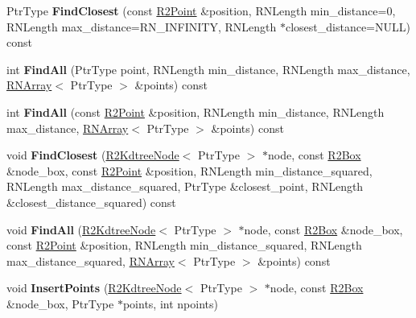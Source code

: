 \begin{DoxyCompactItemize}
\item 
Ptr\+Type {\bfseries Find\+Closest} (const \hyperlink{class_r2_point}{R2\+Point} \&position, R\+N\+Length min\+\_\+distance=0, R\+N\+Length max\+\_\+distance=R\+N\+\_\+\+I\+N\+F\+I\+N\+I\+TY, R\+N\+Length $\ast$closest\+\_\+distance=N\+U\+LL) const \hypertarget{class_r2_kdtree_a26c4b726cec05ccac33804cba6cf038f}{}\label{class_r2_kdtree_a26c4b726cec05ccac33804cba6cf038f}

\item 
int {\bfseries Find\+All} (Ptr\+Type point, R\+N\+Length min\+\_\+distance, R\+N\+Length max\+\_\+distance, \hyperlink{class_r_n_array}{R\+N\+Array}$<$ Ptr\+Type $>$ \&points) const \hypertarget{class_r2_kdtree_a8ad946e2ab17179786670239a4e8fc4e}{}\label{class_r2_kdtree_a8ad946e2ab17179786670239a4e8fc4e}

\item 
int {\bfseries Find\+All} (const \hyperlink{class_r2_point}{R2\+Point} \&position, R\+N\+Length min\+\_\+distance, R\+N\+Length max\+\_\+distance, \hyperlink{class_r_n_array}{R\+N\+Array}$<$ Ptr\+Type $>$ \&points) const \hypertarget{class_r2_kdtree_addf1ad4aa68545c20af85960b151ea6c}{}\label{class_r2_kdtree_addf1ad4aa68545c20af85960b151ea6c}

\item 
void {\bfseries Find\+Closest} (\hyperlink{class_r2_kdtree_node}{R2\+Kdtree\+Node}$<$ Ptr\+Type $>$ $\ast$node, const \hyperlink{class_r2_box}{R2\+Box} \&node\+\_\+box, const \hyperlink{class_r2_point}{R2\+Point} \&position, R\+N\+Length min\+\_\+distance\+\_\+squared, R\+N\+Length max\+\_\+distance\+\_\+squared, Ptr\+Type \&closest\+\_\+point, R\+N\+Length \&closest\+\_\+distance\+\_\+squared) const \hypertarget{class_r2_kdtree_accf6d07827d0f5fc0dcfbd270c1652f6}{}\label{class_r2_kdtree_accf6d07827d0f5fc0dcfbd270c1652f6}

\item 
void {\bfseries Find\+All} (\hyperlink{class_r2_kdtree_node}{R2\+Kdtree\+Node}$<$ Ptr\+Type $>$ $\ast$node, const \hyperlink{class_r2_box}{R2\+Box} \&node\+\_\+box, const \hyperlink{class_r2_point}{R2\+Point} \&position, R\+N\+Length min\+\_\+distance\+\_\+squared, R\+N\+Length max\+\_\+distance\+\_\+squared, \hyperlink{class_r_n_array}{R\+N\+Array}$<$ Ptr\+Type $>$ \&points) const \hypertarget{class_r2_kdtree_a57e301e255b49aac81c87a0fb49c375d}{}\label{class_r2_kdtree_a57e301e255b49aac81c87a0fb49c375d}

\item 
void {\bfseries Insert\+Points} (\hyperlink{class_r2_kdtree_node}{R2\+Kdtree\+Node}$<$ Ptr\+Type $>$ $\ast$node, const \hyperlink{class_r2_box}{R2\+Box} \&node\+\_\+box, Ptr\+Type $\ast$points, int npoints)\hypertarget{class_r2_kdtree_a3cf4cafb10733e81bf3d015b4fca00e2}{}\label{class_r2_kdtree_a3cf4cafb10733e81bf3d015b4fca00e2}


\end{DoxyCompactItemize}
